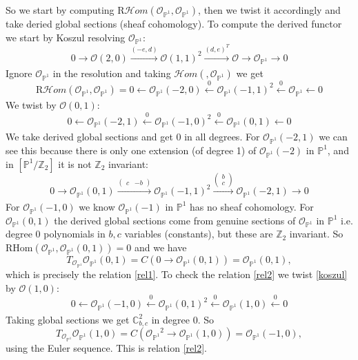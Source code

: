 \documentclass[oneside,reqno]{amsart}
\theoremstyle{definition}
\theoremstyle{definition}
\theoremstyle{definition}
\theoremstyle{definition}
\newcommand{\CC}{\mathbb{C}}
\newcommand{\PP}{\mathbb{P}}
\newcommand{\Z}{\mathbb{Z}}
\newcommand{\Os}{\mathcal{O}}
\begin{document}
So we start by computing $\text{R}\mathcal{H}om(\Os_{\PP^1},\Os_{\PP^1})$, then we twist it accordingly and take deried global sections (sheaf cohomology). To compute the derived functor we start by Koszul resolving $\Os_{\PP^1}$:
\begin{equation*}
0 \xrightarrow[]{} \Os(2,0) \xrightarrow[]{(-e,d)} \Os(1,1)^2\xrightarrow[]{(d,e)^T} \Os \xrightarrow[]{} \Os_{\PP^1} \xrightarrow[] {}0
\end{equation*}
Ignore $\Os_{\PP^1}$ in the resolution and taking $\mathcal{H}om(, \Os_{\PP^1})$ we get
\begin{equation}
\label{koszul}
\text{R}\mathcal{H}om(\Os_{\PP^1},\Os_{\PP^1}) = 0 \xleftarrow[]{} \Os_{\PP^1}(-2,0) \xleftarrow[]{0} \Os_{\PP^1}(-1,1)^2\xleftarrow[]{0} \Os_{\PP^1} \xleftarrow[]{} 0
\end{equation}
We twist by $\Os(0,1)$:
$$
0 \xleftarrow[]{} \Os_{\PP^1}(-2,1) \xleftarrow[]{0} \Os_{\PP^1}(-1,0)^2\xleftarrow[]{0} \Os_{\PP^1}(0,1) \xleftarrow[]{}0
$$
We take derived global sections and get 0 in all degrees. For $\Os_{\PP^1}(-2,1)$ we can see this because there is only one extension (of degree 1) of $\Os_{\PP^1}(-2)$ in $\PP^1$, and in $[ \PP^1 / \Z_2 ]$ it is not $\Z_2$ invariant:
$$
0 \xrightarrow[]{} \Os_{\PP^1}(0,1) \xrightarrow[]{\begin{pmatrix}
    c & -b
\end{pmatrix}} \Os_{\PP^1}(-1,1)^2\xrightarrow[]{\begin{pmatrix}
    b \\
    c
\end{pmatrix}} \Os_{\PP^1}(-2,1) \xrightarrow[]{}0
$$
For $\Os_{\PP^1}(-1,0)$ we know $\Os_{\PP^1}(-1)$ in $\PP^1$ has no sheaf cohomology. For $\Os_{\PP^1}(0,1)$ the derived global sections come from genuine sections of $\Os_{\PP^1}$ in $\PP^1$ i.e. degree 0 polynomials in $b,c$ variables (constants), but these are $\Z_2$ invariant.
So $\text{RHom}\left(\Os_{\PP^1},\Os_{\PP^1}(0,1)\right) = 0$ and we have
$$
T_{\Os_{\PP^1}}\Os_{\PP^1}(0,1) = C(0 \to \Os_{\PP^1}(0,1)) =\Os_{\PP^1}(0,1),
$$
which is precisely the relation \eqref{rel1}. To check the relation \eqref{rel2} we twist \eqref{koszul} by $\Os(1,0)$:
\begin{equation*}
0 \xleftarrow[]{} \Os_{\PP^1}(-1,0) \xleftarrow[]{0} \Os_{\PP^1}(0,1)^2\xleftarrow[]{0} \Os_{\PP^1}(1,0) \xleftarrow[]{0} 0
\end{equation*}
Taking global sections we get $\CC^2_{b,c}$ in degree 0. So
$$
T_{\Os_{\PP^1}}\Os_{\PP^1}(1,0) = C({\Os_{\PP^1}}^2 \to \Os_{\PP^1}(1,0)) =\Os_{\PP^1}(-1,0),
$$
using the Euler sequence. This is relation \eqref{rel2}.
\end{document}
